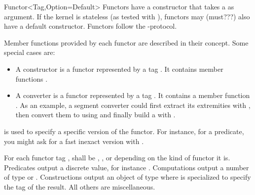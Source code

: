 \begin{ccRefConcept}[Kernel::]{Functor<Tag,Option=Default>}
Functors have a constructor that takes a  as argument. If the kernel is stateless (as tested with ), functors may (must???) also have a default constructor. Functors follow the -protocol.

Member functions provided by each functor are described in their concept. Some special cases are:
\begin{itemize}
  \item A constructor is a functor represented by a tag . It contains member functions .
  \item A converter is a functor represented by a tag . It contains a member function . As an example, a segment converter could first extract its extremities with , then convert them to  using  and finally build a  with .
\end{itemize}

 is used to specify a specific version of the functor. For instance, for a predicate, you might ask for a fast inexact version with .

For each functor tag ,  shall be
, ,  or 
depending on the kind of functor it is. Predicates output a discrete value, for instance . Computations output a number of type  or . Constructions output an object of type  where  is specialized to specify the tag of the result. All others are miscellaneous.


\end{ccRefConcept}

